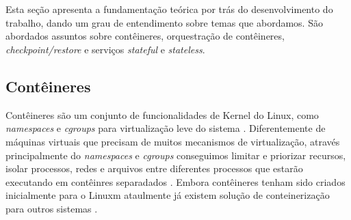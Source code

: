 

\chapter{} \label{cap:fundamentacao:teorica}

Esta seção apresenta a fundamentação teórica por trás do desenvolvimento
do trabalho, dando um grau de entendimento sobre temas que abordamos. São
abordados assuntos sobre contêineres, orquestração de contêineres,
\textit{checkpoint/restore} e serviços \textit{stateful} e \textit{stateless}.

\section{Contêineres}

Contêineres são um conjunto de funcionalidades de Kernel do Linux, como
\textit{namespaces} e \textit{cgroups} \cite{laadan2010linux} para virtualização
leve do sistema \cite{Chen2015/10} \cite{kubernetes}. Diferentemente de máquinas
virtuais que precisam de muitos mecanismos de virtualização, através principalmente
do \textit{namespaces} e \textit{cgroups} conseguimos limitar e priorizar recursos,
isolar processos, redes e arquivos entre diferentes processos que estarão executando
em contêinres separadados \cite{kubernetes}. Embora contêineres tenham sido criados
inicialmente para o Linuxm ataulmente já existem solução de conteinerização para
outros sistemas \cite{laadan2010linux}.

